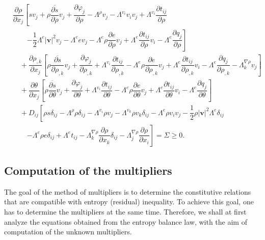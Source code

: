 \documentclass[a4paper,fleqn]{cas-sc}
\theoremstyle{definition}
\begin{document}
\begin{align} \label{osnovna rezidualna nejednakost Kortevegovi fluidi}
	& \dfrac{\partial\rho}{\partial x_j} \left[sv_j+\rho\overline{\dfrac{\partial s}{\partial\rho}}v_j+\dfrac{\partial\varphi_j}{\partial\rho}-\Lambda^\rho v_j-\Lambda^{v_i}v_iv_j+\Lambda^{v_i}\dfrac{\partial t_{ij}}{\partial\rho}
	\right. 
	\nonumber \\  
	& \qquad \left. -\dfrac{1}{2}\Lambda^e|\mathbf{v}|^2v_j -\Lambda^e e v_j-\Lambda^e \rho\dfrac{\partial e}{\partial\rho}v_j+\Lambda^e\dfrac{\partial t_{ij}}{\partial\rho}v_i-\Lambda^e\dfrac{\partial q_j}{\partial\rho}\right] 
	\nonumber \\
	& \quad + \dfrac{\partial\rho_{,k}}{\partial x_j} \left[\rho\overline{\dfrac{\partial s}{\partial\rho_{,k}}}v_j+\dfrac{\partial\varphi_j}{\partial\rho_{,k}}+\Lambda^{v_i}\dfrac{\partial t_{ij}}{\partial\rho_{,k}}-\Lambda^e\rho\dfrac{\partial e}{\partial\rho_{,k}}v_j %
	+ \Lambda^e\dfrac{\partial t_{ij}}{\partial\rho_{,k}}v_i-\Lambda^e\dfrac{\partial q_j}{\partial\rho_{,k}}-\Lambda^{\nabla\rho}_k v_j\right] 
	\\
	& \quad +\dfrac{\partial\theta}{\partial x_j}\left[\rho\overline{\dfrac{\partial s}{\partial\theta}}v_j+\dfrac{\partial\varphi_j}{\partial\theta}+\Lambda^{v_i}\dfrac{\partial t_{ij}}{\partial\theta}-\Lambda^e\rho\dfrac{\partial e}{\partial\theta}v_j+\Lambda^e\dfrac{\partial t_{ij}}{\partial\theta}v_i-\Lambda^e\dfrac{\partial q_j}{\partial\theta}\right] 
	\nonumber \\
	& \quad + D_{ij}\left[\rho s \delta_{ij}-\Lambda^\rho\rho\delta_{ij}-\Lambda^{v_i}\rho v_j-\Lambda^{v_k}\rho v_k\delta_{ij}-\Lambda^e\rho v_i v_j-\dfrac{1}{2}\rho\vert \mathbf{v}\vert^2\Lambda^e\delta_{ij} \right.
	\nonumber \\ 
	& \qquad \left. - \Lambda^e\rho e\delta_{ij} + \Lambda^et_{ij}-\Lambda^{\nabla\rho}_k\dfrac{\partial\rho}{\partial x_k}\delta_{ij}-\Lambda^{\nabla\rho}_j\dfrac{\partial\rho}{\partial x_i} \right] = \Sigma\geq 0. 
	\nonumber 
\end{align}

\subsection{Computation of the multipliers}

The goal of the method of multipliers is to determine the constitutive relations that are compatible with entropy (residual) inequality. To achieve this goal, one has to determine the multipliers at the same time. Therefore, we shall at first analyze the equations obtained from the entropy balance law, with the aim of computation of the unknown multipliers. 
\end{document}

